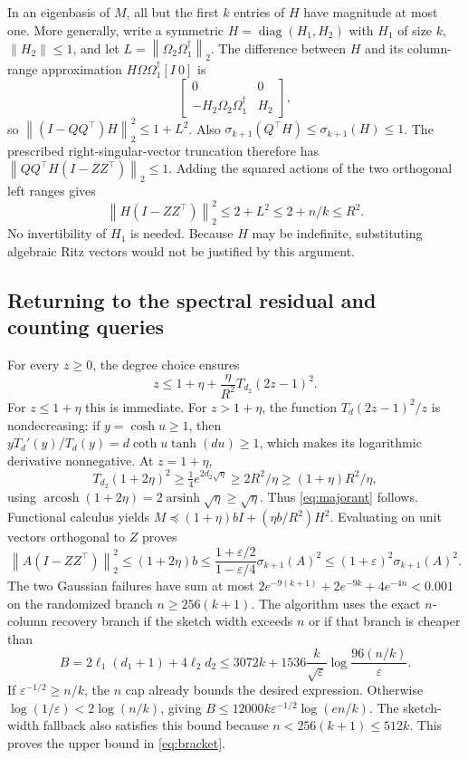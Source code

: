 \documentclass[11pt]{article}
\numberwithin{equation}{section}
\theoremstyle{remark}\newtheorem{remark}[theorem]{Remark}
\newcommand{\eps}{\varepsilon}
\newcommand{\norm}[1]{\left\lVert #1\right\rVert}
\newcommand{\diag}{\operatorname{diag}}
\begin{document}
In an eigenbasis of $M$, all but the first $k$ entries of $H$ have magnitude at most one. More generally, write a symmetric $H=\diag(H_1,H_2)$ with $H_1$ of size $k$, $\norm{H_2}\le1$, and let $L=\norm{\Omega_2\Omega_1^\dagger}_2$. The difference between $H$ and its column-range approximation $H\Omega\Omega_1^\dagger[I\ 0]$ is
\[
\begin{bmatrix}0&0\\-H_2\Omega_2\Omega_1^\dagger&H_2\end{bmatrix},
\]
so $\norm{(I-QQ^\top)H}_2^2\le1+L^2$. Also $\sigma_{k+1}(Q^\top H)\le\sigma_{k+1}(H)\le1$. The prescribed right-singular-vector truncation therefore has
$\norm{QQ^\top H(I-ZZ^\top)}_2\le1$. Adding the squared actions of the two orthogonal left ranges gives
\[
\norm{H(I-ZZ^\top)}_2^2\le2+L^2\le2+n/k\le R^2.
\]
No invertibility of $H_1$ is needed. Because $H$ may be indefinite, substituting algebraic Ritz vectors would not be justified by this argument.

\subsection{Returning to the spectral residual and counting queries}
For every $z\ge0$, the degree choice ensures
\begin{equation}\label{eq:majorant}
z\le1+\eta+\frac{\eta}{R^2}T_{d_2}(2z-1)^2.
\end{equation}
For $z\le1+\eta$ this is immediate. For $z>1+\eta$, the function $T_d(2z-1)^2/z$ is nondecreasing: if $y=\cosh u\ge1$, then $yT_d'(y)/T_d(y)=d\coth u\tanh(du)\ge1$, which makes its logarithmic derivative nonnegative. At $z=1+\eta$,
\[
T_{d_2}(1+2\eta)^2\ge\tfrac14e^{2d_2\sqrt\eta}\ge2R^2/\eta\ge(1+\eta)R^2/\eta,
\]
using $\operatorname{arcosh}(1+2\eta)=2\operatorname{arsinh}\sqrt\eta\ge\sqrt\eta$. Thus \eqref{eq:majorant} follows.
Functional calculus yields
$M\preceq(1+\eta)bI+(\eta b/R^2)H^2$. Evaluating on unit vectors orthogonal to $Z$ proves
\[
\norm{A(I-ZZ^\top)}_2^2\le(1+2\eta)b
\le\frac{1+\eps/2}{1-\eps/4}\sigma_{k+1}(A)^2
\le(1+\eps)^2\sigma_{k+1}(A)^2.
\]
The two Gaussian failures have sum at most
$2e^{-9(k+1)}+2e^{-9k}+4e^{-4n}<0.001$
on the randomized branch $n\ge256(k+1)$. The algorithm uses the exact $n$-column recovery branch if the sketch width exceeds $n$ or if that branch is cheaper than
\[
B=2\ell_1(d_1+1)+4\ell_2d_2
\le3072k+1536\frac{k}{\sqrt\eps}\log\frac{96(n/k)}{\eps}.
\]
If $\eps^{-1/2}\ge n/k$, the $n$ cap already bounds the desired expression. Otherwise $\log(1/\eps)<2\log(n/k)$, giving $B\le12000k\eps^{-1/2}\log(en/k)$. The sketch-width fallback also satisfies this bound because $n<256(k+1)\le512k$. This proves the upper bound in \eqref{eq:bracket}.
\end{document}
